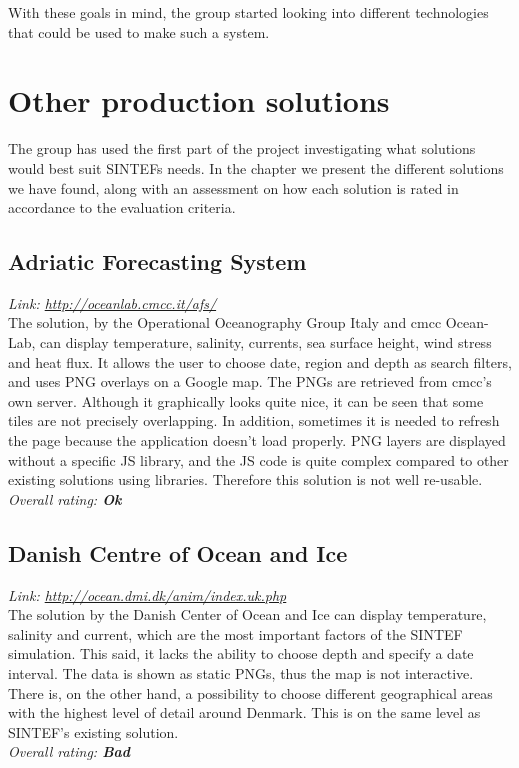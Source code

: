 \documentclass[11pt,a4paper,titlepage,oneside]{report}
\begin{document}
With these goals in mind, the group started looking into different technologies that could be used to make such a system.

\section{Other production solutions}
The group has used the first part of the project investigating what solutions would best suit SINTEFs needs. In the chapter we present the different solutions we have found, along with an assessment on how each solution is rated in accordance to the evaluation criteria. 

\subsection{Adriatic Forecasting System}
\emph{Link: \url{http://oceanlab.cmcc.it/afs/}} \\%
  The solution, by the Operational Oceanography Group Italy and cmcc Ocean-Lab, can display temperature, salinity, currents, sea surface height, wind stress and heat flux. It allows the user to choose date, region and depth as search filters, and uses \gls{PNG} overlays on a Google map. The PNGs are retrieved from cmcc's own server.
  Although it graphically looks quite nice, it can be seen that some tiles are not precisely overlapping. In addition, sometimes it is needed to refresh the page because the application doesn't load properly. \gls{PNG} layers are displayed without a specific JS library, and the JS code is quite complex compared to other existing solutions using libraries. Therefore this solution is not well re-usable.
\\ \emph{Overall rating: \textbf{Ok}}

\subsection{Danish Centre of Ocean and Ice}
  \emph{Link: \url{http://ocean.dmi.dk/anim/index.uk.php }} \\%
    The solution by the Danish Center of Ocean and Ice can display temperature, salinity and current, which are the most important factors of the SINTEF simulation. This said, it lacks the ability to choose depth and specify a date interval. The data is shown as static PNGs, thus the map is not interactive. There is, on the other hand, a possibility to choose different geographical areas with the highest level of detail around Denmark. This is on the same level as SINTEF's existing solution.
  \\ \emph{Overall rating: \textbf{Bad}}
\end{document}
